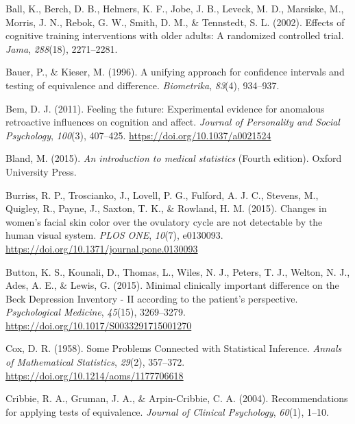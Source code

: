 \documentclass[
  letterpaper,
  DIV=11,
  numbers=noendperiod]{scrreprt}
\newlength{\cslhangindent}
\newlength{\cslentryspacingunit} %
\newenvironment{CSLReferences}[2] %
 {%
  \setlength{\parindent}{0pt}
  \ifodd #1
  \let\oldpar\par
  \def\par{\hangindent=\cslhangindent\oldpar}
  \fi
  \setlength{\parskip}{#2\cslentryspacingunit}
 }%
 {}
\begin{document}
\begin{CSLReferences}{1}{0}
\leavevmode{}%
Ball, K., Berch, D. B., Helmers, K. F., Jobe, J. B., Leveck, M. D.,
Marsiske, M., Morris, J. N., Rebok, G. W., Smith, D. M., \& Tennstedt,
S. L. (2002). Effects of cognitive training interventions with older
adults: A randomized controlled trial. \emph{Jama}, \emph{288}(18),
2271--2281.

\leavevmode{}%
Bauer, P., \& Kieser, M. (1996). A unifying approach for confidence
intervals and testing of equivalence and difference. \emph{Biometrika},
\emph{83}(4), 934--937.

\leavevmode{}%
Bem, D. J. (2011). Feeling the future: Experimental evidence for
anomalous retroactive influences on cognition and affect. \emph{Journal
of Personality and Social Psychology}, \emph{100}(3), 407--425.
\url{https://doi.org/10.1037/a0021524}

\leavevmode{}%
Bland, M. (2015). \emph{An introduction to medical statistics} (Fourth
edition). {Oxford University Press}.

\leavevmode{}%
Burriss, R. P., Troscianko, J., Lovell, P. G., Fulford, A. J. C.,
Stevens, M., Quigley, R., Payne, J., Saxton, T. K., \& Rowland, H. M.
(2015). Changes in women's facial skin color over the ovulatory cycle
are not detectable by the human visual system. \emph{PLOS ONE},
\emph{10}(7), e0130093.
\url{https://doi.org/10.1371/journal.pone.0130093}

\leavevmode{}%
Button, K. S., Kounali, D., Thomas, L., Wiles, N. J., Peters, T. J.,
Welton, N. J., Ades, A. E., \& Lewis, G. (2015). Minimal clinically
important difference on the {Beck Depression Inventory} - {II} according
to the patient's perspective. \emph{Psychological Medicine},
\emph{45}(15), 3269--3279.
\url{https://doi.org/10.1017/S0033291715001270}

\leavevmode{}%
Cox, D. R. (1958). Some {Problems Connected} with {Statistical
Inference}. \emph{Annals of Mathematical Statistics}, \emph{29}(2),
357--372. \url{https://doi.org/10.1214/aoms/1177706618}

\leavevmode{}%
Cribbie, R. A., Gruman, J. A., \& Arpin-Cribbie, C. A. (2004).
Recommendations for applying tests of equivalence. \emph{Journal of
Clinical Psychology}, \emph{60}(1), 1--10.


\end{CSLReferences}
\end{document}
